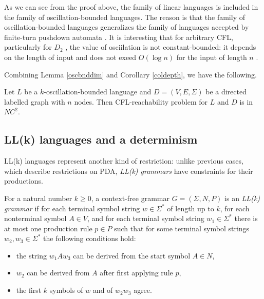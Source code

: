 As we can see from the proof above, the family of linear languages is included in the family of oscillation-bounded languages. The reason is that the family of oscillation-bounded languages generalizes the family of languages accepted by finite-turn pushdown automata \cite{BoundOsc}. It is interesting that for arbitrary CFL, particularly for $D_2$ , the value of osciilation is not constant-bounded: it depends on the length of input and does not exeed $O(\log n)$ for the input of length $n$ \cite*{Wechsung, Gundermann}.


Combining Lemma \ref{oscbnddim} and Corollary \ref{coldepth}, we have the following.
\begin{corollary} 
Let  $L$ be a $k$-oscillation-bounded language and $D=(V, E, \Sigma)$ be a directed labelled graph with $n$ nodes. Then CFL-reachability problem for $L$ and $D$ is in $NC^2$.
\end{corollary}



\subsection{LL(k) languages and a determinism}
LL(k) languages represent another kind of restriction: unlike previous cases, which describe restrictions on PDA, \textit{LL(k) grammars} have constraints for their productions.


For a natural number $k \ge 0$, a context-free grammar $G = (\Sigma, N, P)$ is an \textit{LL(k) grammar} if for each terminal symbol string $w \in \Sigma^*$ of length up to $k$, for each nonterminal symbol $A \in V$, and for each terminal symbol string $w_{1}\in \Sigma ^{*}$ there is at most one production rule $p \in P$ such that for some terminal symbol strings $w_{2},w_{3}\in \Sigma ^{*}$ the following conditions hold:
\begin{itemize}
\item the string $w_{1}Aw_{3}$ can be derived from the start symbol $A \in N$,
\item  $w_{2}$ can be derived from $A$ after first applying rule $p$,
\item the first $k$ symbols of $w$ and of $w_{2}w_{3}$ agree.
\end{itemize}


